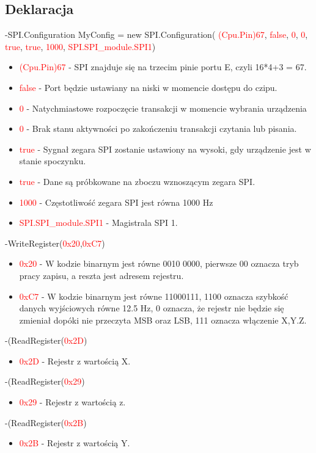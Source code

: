 \documentclass{article}
\begin{document}
\subsection{Deklaracja}
-SPI.Configuration MyConfig =
new SPI.Configuration(\space \textcolor{red}{ (Cpu.Pin)67},\space \textcolor{red}{ false},\space \textcolor{red}{ 0}, \space \textcolor{red}{ 0},\space \textcolor{red}{ true},\space \textcolor{red}{ true},\space \textcolor{red}{ 1000},\space \textcolor{red}{ SPI.SPI\_module.SPI1})
\begin{itemize}
\item \textcolor{red}{(Cpu.Pin)67} - SPI znajduje się na trzecim pinie portu E, czyli 16*4+3 = 67.
\item \textcolor{red}{false} - Port będzie ustawiany na niski w momencie dostępu do czipu.
\item \textcolor{red}{0} - Natychmiastowe rozpoczęcie transakcji w momencie wybrania urządzenia
\item \textcolor{red}{0} - Brak stanu aktywności po zakończeniu transakcji czytania lub pisania.
\item \textcolor{red}{true} - Sygnał zegara SPI zostanie ustawiony na wysoki, gdy urządzenie jest w stanie spoczynku.
\item \textcolor{red}{true} -  Dane są próbkowane na zboczu wznoszącym zegara SPI.
\item \textcolor{red}{1000} -  Częstotliwość zegara SPI jest równa 1000 Hz
\item \textcolor{red}{SPI.SPI\_module.SPI1} - Magistrala SPI 1. 
\end{itemize}
-WriteRegister(\space \textcolor{red}{0x20},\space \textcolor{red}{0xC7})
\begin{itemize}
\item \textcolor{red}{0x20} -  W kodzie binarnym jest równe 0010 0000, pierwsze 00 oznacza tryb pracy zapisu, a reszta jest adresem rejestru.
\item \textcolor{red}{0xC7} -  W kodzie binarnym jest równe 11000111, 1100 oznacza szybkość danych wyjściowych równe 12.5 Hz, 0 oznacza, że rejestr nie będzie się zmieniał dopóki nie przeczyta MSB oraz LSB, 111 oznacza włączenie X,Y.Z.
\end{itemize}
-(ReadRegister(\textcolor{red}{0x2D})
\begin{itemize}
\item \textcolor{red}{0x2D } - Rejestr z wartością X.
\end{itemize}
-(ReadRegister(\textcolor{red}{0x29})
\begin{itemize}
\item \textcolor{red}{ 0x29 } - Rejestr z wartością z.
\end{itemize}
-(ReadRegister(\textcolor{red}{0x2B})
\begin{itemize}
\item \textcolor{red}{ 0x2B } - Rejestr z wartością Y.
\end{itemize}
\end{document}
